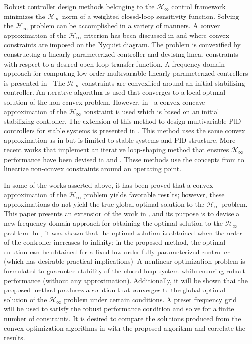 \documentclass[letterpaper, 10 pt, conference]{ieeeconf}  %
\begin{document}
Robust controller design methods belonging to the $\mathcal{H}_{\infty}$ control framework minimizes the $\mathcal{H}_{\infty}$ norm of a weighted closed-loop sensitivity function. Solving the $\mathcal{H}_{\infty}$ problem can be accomplished in a variety of manners. A convex approximation of the $\mathcal{H}_\infty$ criterion has been discussed in \cite{KG10} and \cite{KGL08} where convex constraints are imposed on the Nyquist diagram. The problem is convexified by constructing a linearly parameterized controller and devising linear constraints with respect to a desired open-loop transfer function.  A frequency-domain approach for computing low-order multivariable linearly parameterized controllers is presented in \cite{SOW10}. The $\mathcal{H}_{\infty}$ constraints are convexified around an initial stabilizing controller. An iterative algorithm is used that converges to a local optimal solution of the non-convex problem. However, in \cite{HAB13},  a convex-concave approximation of the $\mathcal{H}_{\infty}$ constraint is used which is based on an initial stabilizing controller. The extension of this method to design multivariable PID controllers for stable systems is presented in \cite{BHA16}. This method uses the same convex approximation as in  \cite{SOW10} but is limited to stable systems and PID structure. More recent works that implement an iterative loop-shaping method that ensures $\mathcal{H}_{\infty}$ performance have been devised in \cite{UYY16} and \cite{KK16}. These methods use the concepts from \cite{BHA16} to linearize non-convex constraints around an operating point. 

In some of the works asserted above, it has been proved that a convex approximation of the $\mathcal{H}_{\infty}$ problem yields favorable results; however, these approximations do not yield the true global optimal solution to the $\mathcal{H}_{\infty}$ problem. This paper presents an extension of the work in \cite{KNZ16}, and its purpose is to devise a new frequency-domain approach for obtaining the optimal solution to the $\mathcal{H}_{\infty}$ problem. In \cite{KNZ16}, it was shown that the optimal solution is obtained when the order of the controller increases to infinity; in the proposed method, the optimal solution can be obtained for a fixed low-order fully-parameterized controller (which has desirable practical implications). A nonlinear optimization problem is formulated to guarantee stability of the closed-loop system while ensuring robust performance (without any approximation). Additionally, it will be shown that the proposed method produces a solution that converges to the global optimal solution of the $\mathcal{H}_{\infty}$ problem under certain conditions. A preset frequency grid will be used to satisfy the robust performance condition and solve for a finite number of constraints. It is desired to compare the solutions produced from the convex optimization algorithms in \cite{KNZ16} with the proposed algorithm and correlate the results. 
 
\end{document}
